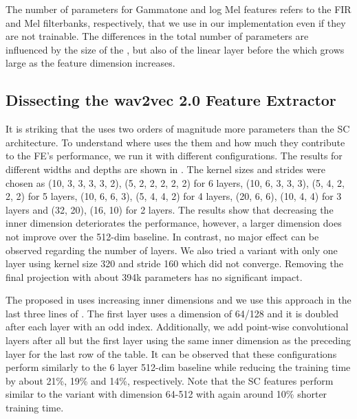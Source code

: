 \documentclass{INTERSPEECH2023}
\begin{document}
The number of parameters for Gammatone and log Mel features refers to the \gls{FIR} and Mel filterbanks, respectively, that we use in our implementation even if they are not trainable.
The differences in the total number of parameters are influenced by the size of the \fe, but also of the linear layer before the \conformer which grows large as the feature dimension increases.


\subsection{Dissecting the wav2vec 2.0 Feature Extractor}
\label{sec:w2v_components}
It is striking that the \wvtwo \fe uses two orders of magnitude more parameters than the \gls{SC} architecture.
To understand where \wvtwo uses the them and how much they contribute to the \gls{FE}'s performance, we run it with different configurations.
The results for different widths and depths are shown in .
The kernel sizes and strides were chosen as (10, 3, 3, 3, 3, 2), (5, 2, 2, 2, 2, 2) for 6 layers, (10, 6, 3, 3, 3), (5, 4, 2, 2, 2) for 5 layers, (10, 6, 6, 3), (5, 4, 4, 2) for 4 layers, (20, 6, 6), (10, 4, 4) for 3 layers and (32, 20), (16, 10) for 2 layers.
The results show that decreasing the inner dimension deteriorates the performance, however, a larger dimension does not improve over the 512-dim baseline.
In contrast, no major effect can be observed regarding the number of layers.
We also tried a variant with only one layer using kernel size 320 and stride 160 which did not converge.
Removing the final projection with about 394k parameters has no significant impact.

%

The proposed \fe in \cite{asapp2022performance} uses increasing inner dimensions and we use this approach in the last three lines of .
The first layer uses a dimension of 64/128 and it is doubled after each layer with an odd index.
Additionally, we add point-wise convolutional layers after all but the first layer using the same inner dimension as the preceding layer for the last row of the table.
It can be observed that these configurations perform similarly to the 6 layer 512-dim baseline while reducing the training time by about 21\%, 19\% and 14\%, respectively.
Note that the \gls{SC} features perform similar to the variant with dimension 64-512 with again around 10\% shorter training time.

\end{document}
